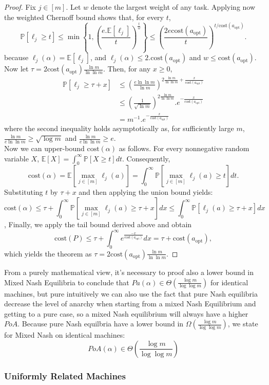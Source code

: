 \documentclass[a4paper,11pt]{article}
\renewcommand{\P}{{\mathbb P}}
\newcommand{\E}{{\mathbb E}}
\newcommand{\cost}{\text{cost}}
\newcommand{\opt}{\text{opt}}
\newcommand{\copt}{\cost(a_{\opt})}
\begin{document}
\begin{proof}
Fix $j \in [m]$. Let $w$ denote the largest weight of any task. Applying now the weighted Chernoff bound shows that, for every $t$,
$$\P[\ell_j \geq t] \leq \min\left\{1, \left(\frac{e.\E[\ell_j]}{t}\right)^{\frac{t}{w}} \right\}      \leq \left(\frac{2e\copt}{t}\right)^{t/\copt}.$$
because $\ell_j(\alpha) = \E[\ell_j]$, and $\ell_j(\alpha) \leq 2.\copt$ and $w \leq \copt$. Now let $\tau = 2\copt\frac{\ln m}{\ln \ln m}$. Then, for any $x \geq 0$,
\begin{eqnarray*}
\P[\ell_j \geq \tau + x] &\leq \left(\frac{e\ln\ln m}{\ln m}\right)^{2\frac{\ln m}{\ln \ln m} + \frac{x}{\copt}}\\
&\leq  \left(\frac{1}{\sqrt{\ln m}}\right)^{2\frac{\ln m}{\ln \ln m}}.e^{-\frac{x}{\copt}}\\
&= m^{-1}.e^{-\frac{x}{\copt}}
\end{eqnarray*}
where the second inequality holds asymptotically as, for sufficiently large $m$, $\frac{\ln m}{e \ln \ln m} \geq \sqrt{\log m}$ and $\frac{\ln m}{e \ln \ln m} \geq e$.\\
Now we can upper-bound $\cost(\alpha)$ as follows. For every nonnegative random variable $X$, $\E[X] = \int_0^\infty \P[X \geq t]dt$. Consequently,
$$\cost(\alpha) = \E\left[\max_{j\in[m]}\ell_j(a)\right] = \displaystyle\int_0^\infty{\P[\max_{j\in[m]}\ell_j(a) \geq t]}dt.$$
Substituting $t$ by $\tau + x$ and then applying the union bound yields:
$$\cost(\alpha) \leq \tau + \displaystyle\int_0^\infty{\P[\max_{j\in[m]}\ell_j(a) \geq \tau + x]}dx \leq 
\displaystyle\int_0^\infty{\P[\ell_j(a) \geq \tau + x]}dx$$, 
Finally, we apply the tail bound derived above and obtain
$$\cost(P) \leq \tau + \displaystyle\int_0^\infty{e^{\frac{-x}{\copt}}}dx = \tau + \copt,$$
which yields the theorem as $\tau = 2\copt\frac{\ln m}{\ln\ln m}.$

\end{proof}
From a purely mathematical view, it's necessary to proof also a lower bound in Mixed Nash Equilibria to conclude that $Pa(\alpha) \in \Theta(\frac{\log m}{\log \log m})$ for identical machines, but pure intuitively we can also use the fact that pure Nash equilibria decrease the level of anarchy when starting from a mixed Nash Equilibrium and getting to a pure case, so a mixed Nash equilibrium will always have a higher $PoA$. Because pure Nash equilbria have a lower bound in $\Omega(\frac{\log m}{\log \log m})$, we state for Mixed Nash on identical machines:
$$PoA(\alpha) \in \Theta(\frac{\log m}{\log \log m})$$
\subsubsection {Uniformly Related Machines}
\end{document}
